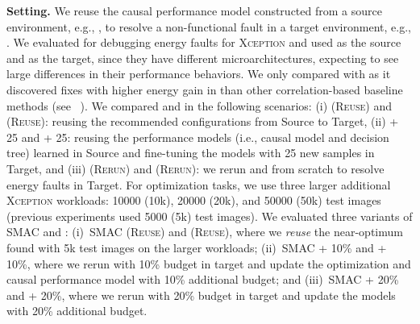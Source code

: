 

\noindent \textbf{Setting.} We reuse the causal performance model constructed from a source environment, e.g., \txone, to resolve a non-functional fault in a target environment, e.g., \xavier. We evaluated \ourapproach for debugging energy faults for \textsc{Xception} and used \xavier as the source and \txtwo as the target, since they have different microarchitectures, expecting to see large differences in their performance behaviors. We only compared with \bugdoc as it discovered fixes with higher energy gain in \xavier than other correlation-based baseline methods (see ~). We compared \ourapproach and \bugdoc in the following scenarios: (i) \bugdoc (\textsc{Reuse}) and \ourapproach (\textsc{Reuse}): reusing the recommended configurations from Source to Target, (ii) \bugdoc \textsc{+ 25} and \ourapproach \textsc{+ 25}: reusing the performance models (i.e., causal model and decision tree) learned in Source and fine-tuning the models with 25 new samples in Target, and (iii) \bugdoc (\textsc{Rerun}) and \ourapproach (\textsc{Rerun}): we rerun \ourapproach and \bugdoc from scratch to resolve energy faults in Target. %
For optimization tasks, we use three larger additional \textsc{Xception} workloads: 10000 (10k), 20000 (20k), and 50000 (50k) test images (previous experiments used 5000 (5k) test images). We evaluated three variants of SMAC and \ourapproach: 
(i)~SMAC (\textsc{Reuse}) and \ourapproach (\textsc{Reuse}), where we \textit{reuse} the near-optimum found with 5k test images on the larger workloads; 
(ii)~SMAC + 10\% and \ourapproach + 10\%, where we rerun with 10\% budget in target and update the optimization and causal performance model with 10\% additional budget; and
(iii)~SMAC + 20\% and \ourapproach + 20\%, where we rerun with 20\% budget in target and update the models with 20\% additional budget.


